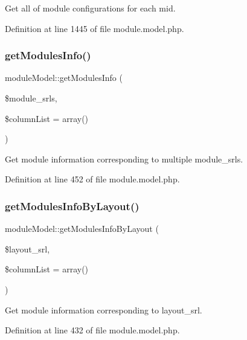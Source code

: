 Get all of module configurations for each mid. 



Definition at line 1445 of file module.\+model.\+php.

\mbox{\label{classmoduleModel_afc4f6749feac12e176959c170ee25012}} 
\subsubsection{\texorpdfstring{get\+Modules\+Info()}{getModulesInfo()}}
{\footnotesize\ttfamily module\+Model\+::get\+Modules\+Info (\begin{DoxyParamCaption}\item[{}]{\$module\+\_\+srls,  }\item[{}]{\$column\+List = {\ttfamily array()} }\end{DoxyParamCaption})}



Get module information corresponding to multiple module\+\_\+srls. 



Definition at line 452 of file module.\+model.\+php.

\mbox{\label{classmoduleModel_a512433daf11267d2bcfafed99caea883}} 
\subsubsection{\texorpdfstring{get\+Modules\+Info\+By\+Layout()}{getModulesInfoByLayout()}}
{\footnotesize\ttfamily module\+Model\+::get\+Modules\+Info\+By\+Layout (\begin{DoxyParamCaption}\item[{}]{\$layout\+\_\+srl,  }\item[{}]{\$column\+List = {\ttfamily array()} }\end{DoxyParamCaption})}



Get module information corresponding to layout\+\_\+srl. 



Definition at line 432 of file module.\+model.\+php.

